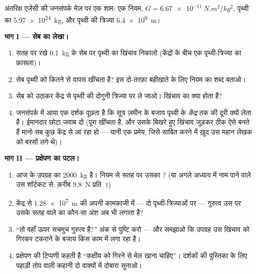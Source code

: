 \begin{problem}\label{pb:g9:gravitation:1}
अंतरिक्ष एजेंसी की जनसंपर्क मेज़ पर एक शाम: एक नियम,
$G = \qty{6.67e-11}{N.m^2/kg^2}$, पृथ्वी का 
\qty{5.97e24}{kg}, और पृथ्वी की त्रिज्या \qty{6.4e6}{m}।

\medskip\noindent\textbf{भाग I --- सेब का लेखा।}
\begin{enumerate}
  \item सतह पर रखे \qty{0.1}{kg} के सेब पर पृथ्वी का खिंचाव निकालो
        (केंद्रों के बीच एक पृथ्वी-त्रिज्या का फ़ासला)।
  \item सेब पृथ्वी को कितने  से वापस खींचता है? इस दो-तरफ़ा
        बहीखाते के लिए नियम का शब्द बताओ।
  \item सेब को उठाकर केंद्र से पृथ्वी की दोगुनी त्रिज्या पर ले जाओ।
        खिंचाव का क्या होता है?
  \item जनसंपर्क में आया एक दर्शक पूछता है कि सूत्र ज़मीन के बजाय
        पृथ्वी के \emph{केंद्र} तक की दूरी क्यों लेता है। ईमानदार
        छोटा जवाब दो (पूरा  खींचता है, और उसके बिखरे हुए खिंचाव
        जुड़कर ठीक ऐसे बनते हैं मानो सब कुछ केंद्र से आ रहा हो ---
        यानी एक प्रमेय, जिसे साबित करने में ख़ुद उस महान लेखक को
        बरसों लगे थे)।
\end{enumerate}

\medskip\noindent\textbf{भाग II --- प्रक्षेपण का पटल।}
\begin{enumerate}[resume]
  \item आज के उपग्रह का  \qty{2000}{kg} है। नियम से सतह पर
        उसका ? (या अगले अध्याय में नाम पाने वाले उस शॉर्टकट से:
        क़रीब \qty{9.8}{N} प्रति ।)
  \item केंद्र से \qty{1.28e7}{m} की अपनी कामकाजी  में ---
        दो पृथ्वी-त्रिज्याओं पर --- गुरुत्व उस पर उसके सतह वाले 
        का कौन-सा अंश अब भी लगाता है?
  \item ``तो वहाँ ऊपर सचमुच गुरुत्व है?'' अंक से पुष्टि करो --- और
        समझाओ कि उपग्रह उस खिंचाव को गिरकर टकराने के बजाय किस काम में
        लगा रहा है।
  \item प्रक्षेपण की टिप्पणी कहती है ``कक्षीय  को गिरने से मेल
        खाना चाहिए''। दर्शकों की पुस्तिका के लिए पहाड़ी तोप वाली कहानी
        दो वाक्यों में दोबारा सुनाओ।
\end{enumerate}


\end{problem}
